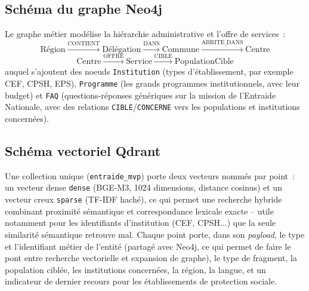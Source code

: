 \subsection{Schéma du graphe Neo4j}

Le graphe métier modélise la hiérarchie administrative et l'offre de services~:
\[
\text{Région} \xrightarrow{\text{CONTIENT}} \text{Délégation} \xrightarrow{\text{DANS}} \text{Commune} \xrightarrow{\text{ABRITE\_DANS}} \text{Centre}
\]
\[
\text{Centre} \xrightarrow{\text{OFFRE}} \text{Service} \xrightarrow{\text{CIBLE}} \text{PopulationCible}
\]
auquel s'ajoutent des noeuds \texttt{Institution} (types d'établissement, par exemple CEF, CPSH, EPS), \texttt{Programme} (les grands programmes institutionnels, avec leur budget) et \texttt{FAQ} (questions-réponses génériques sur la mission de l'Entraide Nationale, avec des relations \texttt{CIBLE}/\texttt{CONCERNE} vers les populations et institutions concernées).

\subsection{Schéma vectoriel Qdrant}

Une collection unique (\texttt{entraide\_mvp}) porte deux vecteurs nommés par point~: un vecteur dense \texttt{dense} (BGE-M3, 1024 dimensions, distance cosinus) et un vecteur creux \texttt{sparse} (TF-IDF haché), ce qui permet une recherche hybride combinant proximité sémantique et correspondance lexicale exacte -- utile notamment pour les identifiants d'institution (CEF, CPSH...) que la seule similarité sémantique retrouve mal. Chaque point porte, dans son \emph{payload}, le type et l'identifiant métier de l'entité (partagé avec Neo4j, ce qui permet de faire le pont entre recherche vectorielle et expansion de graphe), le type de fragment, la population ciblée, les institutions concernées, la région, la langue, et un indicateur de dernier recours pour les établissements de protection sociale.

